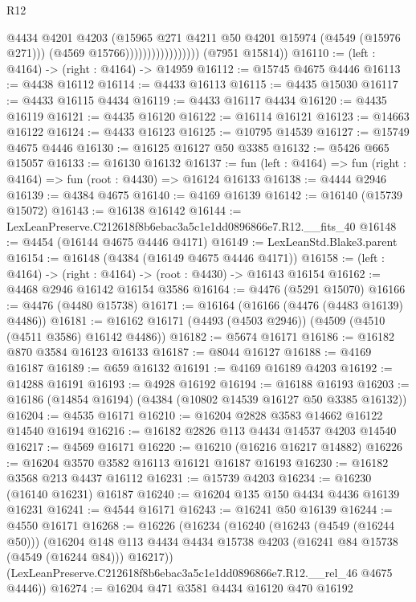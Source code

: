 \begin{lexlean}{R12}
\begin{coremodule}
                                      @4434
                                      @4201
                                      @4203
                                      (@15965 @271 @4211 @50 @4201 @15974 (@4549 (@15976 @271)))
                                      (@4569 @15766)))))))))))))))))
      (@7951 @15814))
@16110 := (left : @4164) -> (right : @4164) -> @14959
@16112 := @15745 @4675 @4446
@16113 := @4438 @16112
@16114 := @4433 @16113
@16115 := @4435 @15030
@16117 := @4433 @16115 @4434
@16119 := @4433 @16117 @4434
@16120 := @4435 @16119
@16121 := @4435 @16120
@16122 := @16114 @16121
@16123 := @14663 @16122
@16124 := @4433 @16123
@16125 := @10795 @14539
@16127 := @15749 @4675 @4446
@16130 := @16125 @16127 @50 @3385
@16132 := @5426 @665 @15057
@16133 := @16130 @16132
@16137 := fun (left : @4164) => fun (right : @4164) => fun (root : @4430) => @16124 @16133
@16138 := @4444 @2946
@16139 := @4384 @4675
@16140 := @4169 @16139
@16142 := @16140 (@15739 @15072)
@16143 := @16138 @16142
@16144 := LexLeanPreserve.C212618f8b6ebac3a5c1e1dd0896866e7.R12.__fits_40
@16148 := @4454 (@16144 @4675 @4446 @4171)
@16149 := LexLeanStd.Blake3.parent
@16154 := @16148 (@4384 (@16149 @4675 @4446 @4171))
@16158 := (left : @4164) -> (right : @4164) -> (root : @4430) -> @16143 @16154
@16162 := @4468 @2946 @16142 @16154 @3586
@16164 := @4476 (@5291 @15070)
@16166 := @4476 (@4480 @15738)
@16171 := @16164 (@16166 (@4476 (@4483 @16139) @4486))
@16181 := @16162 @16171 (@4493 (@4503 @2946)) (@4509 (@4510 (@4511 @3586) @16142 @4486))
@16182 := @5674 @16171
@16186 := @16182 @870 @3584 @16123 @16133
@16187 := @8044 @16127
@16188 := @4169 @16187
@16189 := @659 @16132
@16191 := @4169 @16189 @4203
@16192 := @14288 @16191
@16193 := @4928 @16192
@16194 := @16188 @16193
@16203 := @16186 (@14854 @16194) (@4384 (@10802 @14539 @16127 @50 @3385 @16132))
@16204 := @4535 @16171
@16210 := @16204 @2828 @3583 @14662 @16122 @14540 @16194
@16216 := @16182 @2826 @113 @4434 @14537 @4203 @14540
@16217 := @4569 @16171
@16220 := @16210 (@16216 @16217 @14882)
@16226 := @16204 @3570 @3582 @16113 @16121 @16187 @16193
@16230 := @16182 @3568 @213 @4437 @16112
@16231 := @15739 @4203
@16234 := @16230 (@16140 @16231) @16187
@16240 := @16204 @135 @150 @4434 @4436 @16139 @16231
@16241 := @4544 @16171
@16243 := @16241 @50 @16139
@16244 := @4550 @16171
@16268 := @16226
    (@16234
      (@16240
        (@16243 (@4549 (@16244 @50)))
        (@16204 @148 @113 @4434 @4434 @15738 @4203 (@16241 @84 @15738 (@4549 (@16244 @84))) @16217))
      (LexLeanPreserve.C212618f8b6ebac3a5c1e1dd0896866e7.R12.__rel_46 @4675 @4446))
@16274 := @16204 @471 @3581 @4434 @16120 @470 @16192

\end{coremodule}
\end{lexlean}
